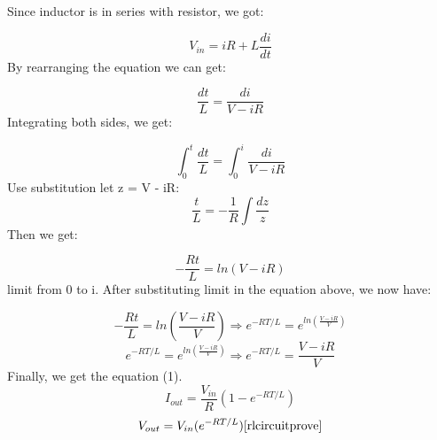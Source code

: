 \documentclass[a4paper, 12pt]{article}
\begin{document}
Since inductor is in series with resistor, we got:\par
\[V_{in} = iR + L\frac{di}{dt}\]
By rearranging the equation we can get:\par
\[\frac{dt}{L} = \frac{di}{V - iR}\]
Integrating both sides, we get:\par
\[\int_{0}^{t} \frac{dt}{L} = \int_{0}^{i}\frac{di}{V - iR}\]
Use substitution let z = V - iR: 
\[\frac{t}{L} = -\frac{1}{R}\int \frac{dz}{z}\]
Then we get:\par
\[-\frac{Rt}{L} = ln(V - iR)\]
\indent limit from 0 to i.
After substituting limit in the equation above, we now have:\par
\[-\frac{Rt}{L} = ln(\frac{V - iR}{V}) \Rightarrow e^{-RT/L} = e^{ln(\frac{V - iR}{V})}\]
\[e^{-RT/L} = e^{ln(\frac{V - iR}{V})} \Rightarrow e^{-RT/L} = \frac{V - iR}{V}\]
Finally, we get the equation (1).
\begin{equation}\label{Exp Iout}
I_{out}=\frac{V_{in}}{R}(1-e^{-RT/L})
\end{equation}
\begin{equation}\label{Exp Vout}
V_{out}=V_{in}(e^{-RT/L})
\cite{rlcircuitprove}
\end{equation}
\end{document}
